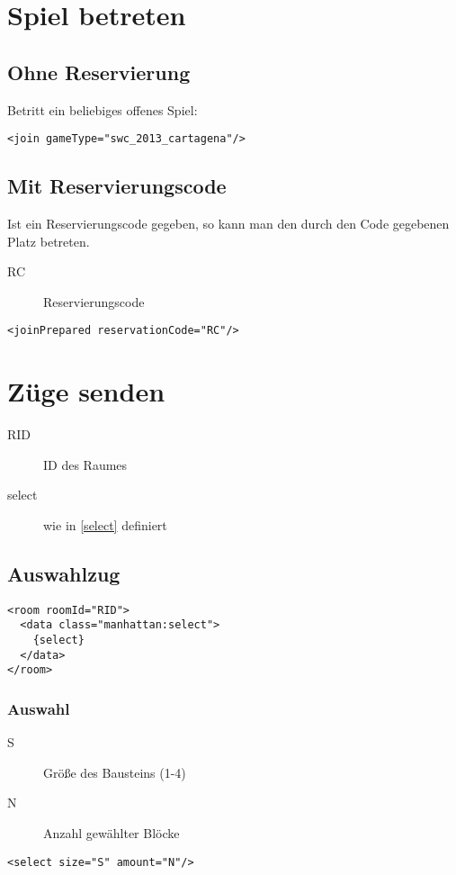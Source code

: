 \documentclass[12pt,a4paper, german, oneside]{scrartcl}
\begin{document}
\section{Spiel betreten}
\subsection{Ohne Reservierung}
Betritt ein beliebiges offenes Spiel:
\begin{verbatim}
<join gameType="swc_2013_cartagena"/>
\end{verbatim}
\subsection{Mit Reservierungscode}
Ist ein Reservierungscode gegeben, so kann man den durch den Code gegebenen Platz betreten.
\begin{description}
\item[RC] Reservierungscode
\end{description}
\begin{verbatim}
<joinPrepared reservationCode="RC"/>
\end{verbatim}

\section{Züge senden}
\begin{description}
\item[RID] ID des Raumes
\item[select] wie in \ref{select} definiert
\end{description}
\subsection{Auswahlzug}

\begin{verbatim}
<room roomId="RID">
  <data class="manhattan:select">
    {select}
  </data>
</room>

\end{verbatim}
\subsubsection{\label{select}Auswahl}
\begin{description}
\item[S] Größe des Bausteins (1-4)
\item[N] Anzahl gewählter Blöcke
\end{description}
\begin{verbatim}
<select size="S" amount="N"/>
\end{verbatim}
\end{document}
